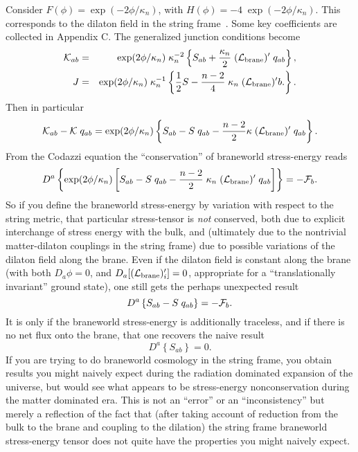 \documentclass[a4paper,10pt]{article}
\begin{document}
{Consider $F(\phi)=\exp(-2\phi/\kappa_n)$, with
$H(\phi)=-4\;\exp(-2\phi/\kappa_n)$. This corresponds to the dilaton
field in the string frame~\cite{generalized-junction}. Some key
coefficients are collected in Appendix C.  The generalized junction
conditions become
% 
\begin{eqnarray}
{\mathcal K}_{ab}&=& \exp(2\phi/\kappa_n)  \; \kappa_n^{-2}
\left\{
S_{ab}+{\kappa_n \over 2} \; ({\mathcal L}_{\mathrm{brane}})' \; q_{ab}
\right\},
\\
J&=& \exp(2\phi/\kappa_n)  \; \kappa_n^{-1}
\left\{
{1 \over 2} S -{n-2 \over 4}\; \kappa_n \; ({\mathcal L}_{\mathrm{brane}})'b.
\right\}.
\end{eqnarray}
% 
Then in particular
%
\begin{equation}
{\mathcal K}_{ab} - {\mathcal K} \; q_{ab} = \exp(2\phi/\kappa_n) 
\left\{
S_{ab} - S\; q_{ab} - {n-2\over2} \kappa \; ({\mathcal L}_{\mathrm{brane}})' \; q_{ab}
\right\}.
\end{equation}
%
From the Codazzi equation the ``conservation'' of braneworld
stress-energy reads
%
\begin{equation}
D^a \left\{  \exp(2\phi/\kappa_n) \left[
S_{ab} - S\; q_{ab} - {n-2\over2} \; \kappa_n \; ({\mathcal L}_{\mathrm{brane}})' \; q_{ab}
\right]
\right\} = - {\mathcal F}_b.
\end{equation}
%
So if you define the braneworld stress-energy by variation with
respect to the string metric, that particular stress-tensor is
{\emph{not}} conserved, both due to explicit interchange of stress
energy with the bulk, and (ultimately due to the nontrivial
matter-dilaton couplings in the string frame) due to possible
variations of the dilaton field along the brane.  Even if the dilaton
field is constant along the brane (with both $D_a \phi=0$, and
$D_a[({\mathcal L}_{\mathrm{brane}})'_i]=0$, appropriate for a ``translationally
invariant'' ground state), one still gets the perhaps unexpected
result
%
\begin{equation}
D^a \left\{ 
S_{ab} - S\; q_{ab}
\right\} = - {\mathcal F}_b.
\end{equation}
%
It is only if the braneworld stress-energy is additionally traceless,
and if there is no net flux onto the brane, that one recovers the
naive result
%
\begin{equation}
D^a \left\{ 
S_{ab}
\right\} = 0.
\end{equation}
%
If you are trying to do braneworld cosmology in the string frame, you
obtain results you might naively expect during the radiation dominated
expansion of the universe, but would see what appears to be
stress-energy nonconservation during the matter dominated era. This is
not an ``error'' or an ``inconsistency'' but merely a reflection of
the fact that (after taking account of reduction from the bulk to the
brane and coupling to the dilation) the string frame braneworld
stress-energy tensor does not quite have the properties you might
naively expect.

}
\end{document}
